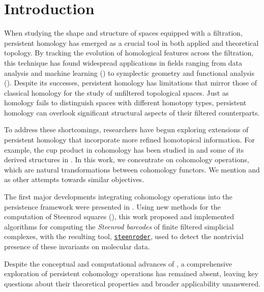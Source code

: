 
\section{Introduction} \label{s:introduction}

When studying the shape and structure of spaces equipped with a filtration, persistent homology has emerged as a crucial tool in both applied and theoretical topology.
By tracking the evolution of homological features across the filtration, this technique has found widespread applications in fields ranging from data analysis and machine learning (\cite{carlsson2013viral, hess2017nano}) to symplectic geometry and functional analysis (\cite{polterovich2020persistence, medina2022fuct_top}).
Despite its successes, persistent homology has limitations that mirror those of classical homology for the study of unfiltered topological spaces.
Just as homology fails to distinguish spaces with different homotopy types, persistent homology can overlook significant structural aspects of their filtered counterparts.

To address these shortcomings, researchers have begun exploring extensions of persistent homology that incorporate more refined homotopical information.
For example, the cup product in cohomology has been studied in \cite{contessoto_et_al:LIPIcs.SoCG.2022.31, memoli2024persistent, huang2005cup, yarmola2010persistence, herscovich2018higher, belchi2021a, contreras2022persistent} and some of its derived structures in \cite{herscovich2018persistence, ginot2019distances, belchi2022persistence, hess2024minimalmodels}.
In this work, we concentrate on cohomology operations, which are natural transformations between cohomology functors. We mention \cite{aubrey2011thesis} and \cite{postol2023persistence} as other attempts towards similar objectives.

The first major developments integrating cohomology operations into the persistence framework were presented in \cite{medina2022per_st}.
Using new methods for the computation of Steenrod squares (\cite{medina2023fast_sq}), this work proposed and implemented algorithms for computing the \textit{Steenrod barcodes} of finite filtered simplicial complexes, with the resulting tool, \href{https://steenroder.github.io/steenroder/}{\texttt{steenroder}}, used to detect the nontrivial presence of these invariants on molecular data.

Despite the conceptual and computational advances of \cite{medina2022per_st}, a comprehensive exploration of persistent cohomology operations has remained absent, leaving key questions about their theoretical properties and broader applicability unanswered.

